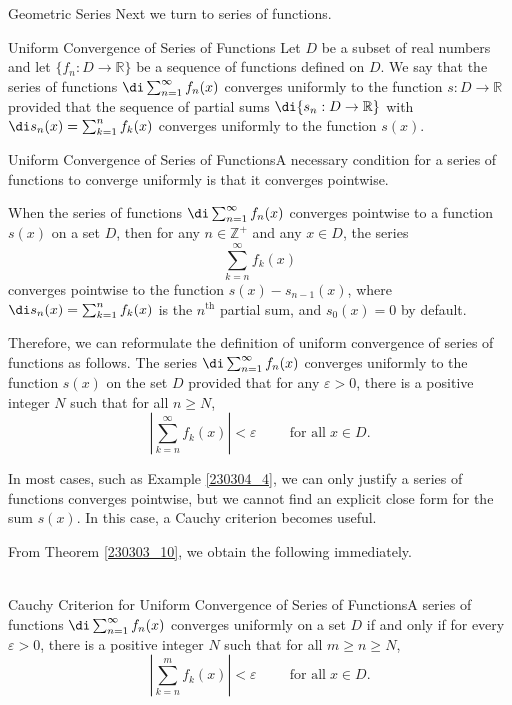 \begin{example}[label=230305_16]{Geometric Series}
Next we turn to series of functions.
\begin{definition}{Uniform Convergence of Series of Functions}
Let $D$ be a subset of real numbers and let $\{f_n:D\to\mathbb{R}\}$ be a sequence of functions defined on $D$. We say that  the series of functions $\di\sum_{n=1}^{\infty}f_n(x)$  converges uniformly to the function $s:D\to\mathbb{R}$ provided that the sequence of partial sums $\di\{s_n:D\rightarrow\mathbb{R}\}$ with $\di s_n(x)=\sum_{k=1}^nf_k(x)$ converges uniformly to the function $s(x)$.
 
\end{definition}

\begin{highlight}{Uniform Convergence of Series of Functions}A necessary condition for a series of functions to converge uniformly is that it converges pointwise.

When the series of functions  $\di\sum_{n=1}^{\infty}f_n(x)$ converges pointwise to a function $s(x)$ on a set $D$, then for any  $n\in \mathbb{Z}^+$ and any $x\in D$, the series
\[\sum_{k=n}^{\infty}f_k(x)\] converges pointwise to the function $s(x)-s_{n-1}(x)$, where  $\di s_n(x)=\sum_{k=1}^nf_k(x)$ is the $n^{\text{th}}$ partial sum, and $s_0(x)=0$ by default.

Therefore, we can reformulate the definition of uniform convergence of series of functions as follows.   The series $\di\sum_{n=1}^{\infty}f_n(x)$  converges uniformly to the function $s(x)$ on the set $D$ provided that for any $\varepsilon>0$, there is a positive integer $N$ such that for all $n\geq N$, 
\[\left|\sum_{k=n}^{\infty} f_k(x)\right|<\varepsilon\hspace{1cm}\text{for all}\;x\in D.\]
\end{highlight}

In most cases, such as Example \ref{230304_4}, we can only justify a series of functions converges pointwise, but we cannot find an explicit close form for the sum $s(x)$. In this case, a Cauchy criterion becomes useful.

From Theorem \ref{230303_10}, we obtain the following immediately. 
\begin{theorem}[label=230304_7]{~\\Cauchy Criterion for Uniform Convergence of Series of Functions}A series of functions $\di\sum_{n=1}^{\infty}f_n(x)$ converges uniformly on a set $D$ if and only if for every $\varepsilon>0$, there is a positive integer $N$ such that for all $m\geq n\geq N$,
\[\left|\sum_{k=n}^mf_k(x)\right|<\varepsilon\hspace{1cm}\text{for all}\;x\in D.\]
\end{theorem}


\end{example}
